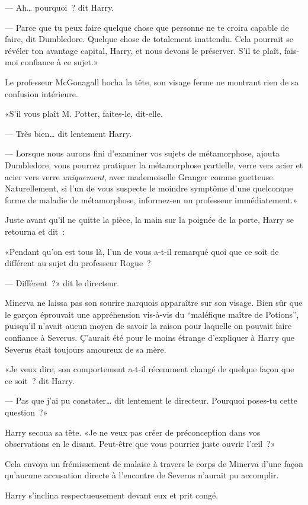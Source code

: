 --- Ah… pourquoi~? dit Harry.

--- Parce que tu peux faire quelque chose que personne ne te croira capable de faire, dit Dumbledore. Quelque chose de totalement inattendu. Cela pourrait se révéler ton avantage capital, Harry, et nous devons le préserver. S'il te plaît, fais-moi confiance à ce sujet.»

Le professeur McGonagall hocha la tête, son visage ferme ne montrant rien de sa confusion intérieure.

«S'il vous plaît M. Potter, faites-le, dit-elle.

--- Très bien… dit lentement Harry.

--- Lorsque nous aurons fini d'examiner vos sujets de métamorphose, ajouta Dumbledore, vous pourrez pratiquer la métamorphose partielle, verre vers acier et acier vers verre \emph{uniquement}, avec mademoiselle Granger comme guetteuse. Naturellement, si l'un de vous suspecte le moindre symptôme d'une quelconque forme de maladie de métamorphose, informez-en un professeur immédiatement.»

Juste avant qu'il ne quitte la pièce, la main sur la poignée de la porte, Harry se retourna et dit~:

«Pendant qu'on est tous là, l'un de vous a-t-il remarqué quoi que ce soit de différent au sujet du professeur Rogue~?

--- Différent~?» dit le directeur.

Minerva ne laissa pas son sourire narquois apparaître sur son visage. Bien sûr que le garçon éprouvait une appréhension vis-à-vis du “maléfique maître de Potions”, puisqu'il n'avait aucun moyen de savoir la raison pour laquelle on pouvait faire confiance à Severus. Ç'aurait été pour le moins étrange d'expliquer à Harry que Severus était toujours amoureux de sa mère.

«Je veux dire, son comportement a-t-il récemment changé de quelque façon que ce soit~? dit Harry.

--- Pas que j'ai pu constater… dit lentement le directeur. Pourquoi poses-tu cette question~?»

Harry secoua sa tête. «Je ne veux pas créer de préconception dans vos observations en le disant. Peut-être que vous pourriez juste ouvrir l'œil~?»

Cela envoya un frémissement de malaise à travers le corps de Minerva d'une façon qu'aucune accusation directe à l'encontre de Severus n'aurait pu accomplir.

Harry s'inclina respectueusement devant eux et prit congé.

